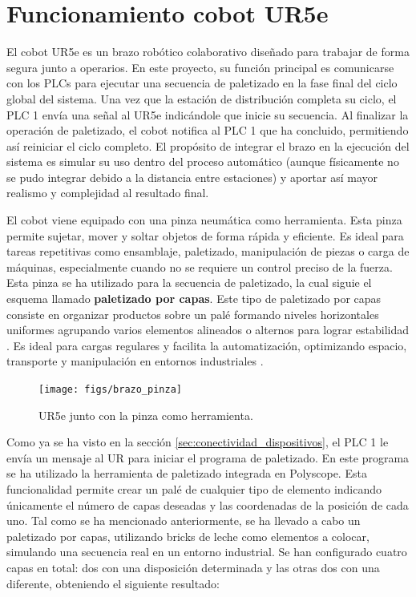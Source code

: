 \clearpage

\section{Funcionamiento cobot UR5e}
\label{sec:funcionamiento_ur5e}

El cobot UR5e es un brazo robótico colaborativo diseñado para trabajar de forma segura junto a operarios. En este proyecto, su función principal es comunicarse con los PLCs para ejecutar una secuencia de paletizado en la fase final del ciclo global del sistema. Una vez que la estación de distribución completa su ciclo, el PLC 1 envía una señal al UR5e indicándole que inicie su secuencia. Al finalizar la operación de paletizado, el cobot notifica al PLC 1 que ha concluido, permitiendo así reiniciar el ciclo completo. El propósito de integrar el brazo en la ejecución del sistema es simular su uso dentro del proceso automático (aunque físicamente no se pudo integrar debido a la distancia entre estaciones) y aportar así mayor realismo y complejidad al resultado final. 

El cobot viene equipado con una pinza neumática como herramienta. Esta pinza permite sujetar, mover y soltar objetos de forma rápida y eficiente. Es ideal para tareas repetitivas como ensamblaje, paletizado, manipulación de piezas o carga de máquinas, especialmente cuando no se requiere un control preciso de la fuerza. Esta pinza se ha utilizado para la secuencia de paletizado, la cual siguie el esquema llamado \textbf{paletizado por capas}. Este tipo de paletizado por capas consiste en organizar productos sobre un palé formando niveles horizontales uniformes agrupando varios elementos alineados o alternos para lograr estabilidad \cite{paletizado_capas}. Es ideal para cargas regulares y facilita la automatización, optimizando espacio, transporte y manipulación en entornos industriales \cite{paletizado_capas}. 

\begin{figure}[h!]
  \begin{center}
  	\texttt{[image: figs/brazo\_pinza]}
  \end{center}
  \caption{\centering UR5e junto con la pinza como herramienta.}
  \label{fig:brazo_pinza}
\end{figure}

Como ya se ha visto en la sección \ref{sec:conectividad_dispositivos}, el PLC 1 le envía un mensaje al UR para iniciar el programa de paletizado. En este programa se ha utilizado la herramienta de paletizado integrada en Polyscope. Esta funcionalidad permite crear un palé de cualquier tipo de elemento indicando únicamente el número de capas deseadas y las coordenadas de la posición de cada uno. Tal como se ha mencionado anteriormente, se ha llevado a cabo un paletizado por capas, utilizando bricks de leche como elementos a colocar, simulando una secuencia real en un entorno industrial. Se han configurado cuatro capas en total: dos con una disposición determinada y las otras dos con una diferente, obteniendo el siguiente resultado:

